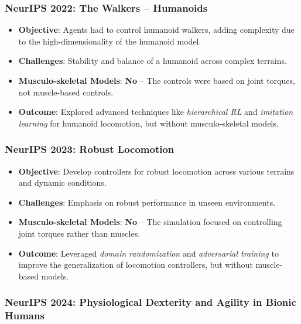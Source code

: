\documentclass[12pt,a4paper]{article}
\begin{document}
\subsubsection{NeurIPS 2022: The Walkers – Humanoids}

\begin{itemize}
    \item \textbf{Objective}: Agents had to control humanoid walkers, adding complexity due to the
        high-dimensionality of the humanoid model.
    \item \textbf{Challenges}: Stability and balance of a humanoid across complex terrains.
    \item \textbf{Musculo-skeletal Models}: \textbf{No} – The controls were based on joint torques,
        not muscle-based controls.
    \item \textbf{Outcome}: Explored advanced techniques like \textit{hierarchical RL} and
        \textit{imitation learning} for humanoid locomotion, but without musculo-skeletal models.
\end{itemize}

\subsubsection{NeurIPS 2023: Robust Locomotion}

\begin{itemize}
    \item \textbf{Objective}: Develop controllers for robust locomotion across various terrains and
        dynamic conditions.
    \item \textbf{Challenges}: Emphasis on robust performance in unseen environments.
    \item \textbf{Musculo-skeletal Models}: \textbf{No} – The simulation focused on controlling
        joint torques rather than muscles.
    \item \textbf{Outcome}: Leveraged \textit{domain randomization} and
        \textit{adversarial training} to improve the generalization of locomotion controllers,
        but without muscle-based models.
\end{itemize}

\subsubsection{NeurIPS 2024: Physiological Dexterity and Agility in Bionic Humans}
\end{document}
